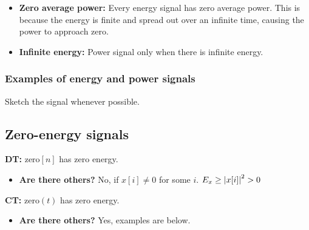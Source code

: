     \begin{warning}
        \begin{itemize}
            \item \textbf{Zero average power:} Every energy signal has zero average power. This is because the energy is finite and spread out over an infinite time, causing the power to approach zero. 
            \item \textbf{Infinite energy:} Power signal only when there is infinite energy.
        \end{itemize}
    \end{warning}

    \subsubsection{Examples of energy and power signals}
    \begin{example}        
    \end{example}

    \begin{intuition}
        Sketch the signal whenever possible.
    \end{intuition}

\subsection{Zero-energy signals}
    \begin{definition}
        
        \textbf{DT:} $\text{zero}[n]$ has zero energy.
        \begin{itemize}
            \item \textbf{Are there others?} No, if $x[i] \neq 0$ for some $i$. $E_x \geq \abs{x[i]}^2 > 0$
        \end{itemize}

        \textbf{CT:} $\text{zero}(t)$ has zero energy.
        \begin{itemize}
            \item \textbf{Are there others?} Yes, examples are below.
        \end{itemize}
    \end{definition}


